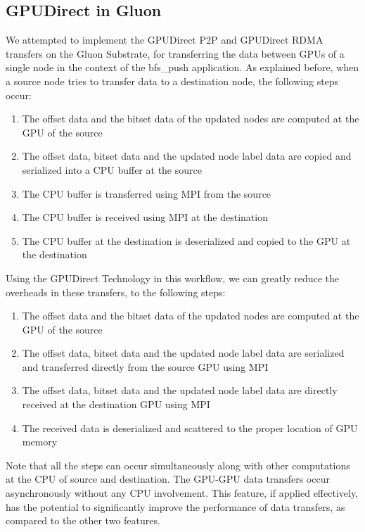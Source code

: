 \subsection{GPUDirect in Gluon}
We attempted to implement the GPUDirect P2P and GPUDirect RDMA transfers on the Gluon Substrate, for transferring the data between GPUs of a single node in the context of the bfs\_push application. As explained before, when a source node tries to transfer data to a destination node, the following steps occur:
\begin{enumerate}
\item The offset data and the bitset data of the updated nodes are computed at the GPU of the source
\item The offset data, bitset data and the updated node label data are copied and serialized into a CPU buffer at the source
\item The CPU buffer is transferred using MPI from the source
\item The CPU buffer is received using MPI at the destination
\item The CPU buffer at the destination is deserialized and copied to the GPU at the destination
\end{enumerate}
Using the GPUDirect Technology in this workflow, we can greatly reduce the overheads in these transfers, to the following steps:
\begin{enumerate}
\item The offset data and the bitset data of the updated nodes are computed at the GPU of the source
\item The offset data, bitset data and the updated node label data are serialized and transferred directly from the source GPU using MPI
\item The offset data, bitset data and the updated node label data are directly received at the destination GPU using MPI
\item The received data is deserialized and scattered to the proper location of GPU memory
\end{enumerate}
Note that all the steps can occur simultaneously along with other computations at the CPU of source and destination. The GPU-GPU data transfers occur asynchronously without any CPU involvement. This feature, if applied effectively, has the potential to significantly improve the performance of data transfers, as compared to the other two features.

